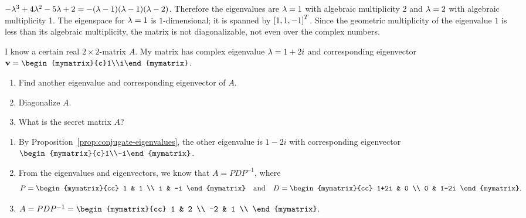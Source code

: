 \begin{ex}
\begin{sol}
\begin{enumerate}
      $-\lambda^3 +4\lambda^2 -5\lambda + 2 =
      -(\lambda-1)(\lambda-1)(\lambda-2)$. Therefore the
      eigenvalues are $\lambda=1$ with algebraic multiplicity 2 and
      $\lambda=2$ with algebraic multiplicity 1. The eigenspace for
      $\lambda=1$ is $1$-dimensional; it is spanned by
      $\left[1,1,-1\right]^T$. Since the geometric multiplicity of the
      eigenvalue $1$ is less than its algebraic multiplicity, the
      matrix is not diagonalizable, not even over the complex numbers.
    \end{enumerate}
  \end{sol}
\end{ex}

\begin{ex}
  I know a certain real $2\times 2$-matrix $A$. My matrix has complex
  eigenvalue $\lambda=1+2i$ and corresponding eigenvector
  $\vect{v}=\begin{mymatrix}{c}1\\i\end{mymatrix}$.
  \begin{enumerate}
  \item Find another eigenvalue and corresponding eigenvector of $A$.
  \item Diagonalize $A$.
  \item What is the secret matrix $A$?
  \end{enumerate}

  \begin{sol}
    \begin{enumerate}
    \item By Proposition~\ref{prop:conjugate-eigenvalues}, the other
      eigenvalue is $1-2i$ with corresponding eigenvector
      $\begin{mymatrix}{c}1\\-i\end{mymatrix}$.
    \item From the eigenvalues and eigenvectors, we know that
      $A=PDP^{-1}$, where
      \begin{equation*}
        P = \begin{mymatrix}{cc}
          1 & 1 \\
          i & -i
        \end{mymatrix}
        \quad\mbox{and}\quad
        D = \begin{mymatrix}{cc}
          1+2i & 0 \\
          0 & 1-2i
        \end{mymatrix}.
      \end{equation*}
    \item $A = PDP^{-1} = \begin{mymatrix}{cc}
        1 & 2 \\
        -2 & 1 \\
      \end{mymatrix}$.
    \end{enumerate}
  \end{sol}
\end{ex}

